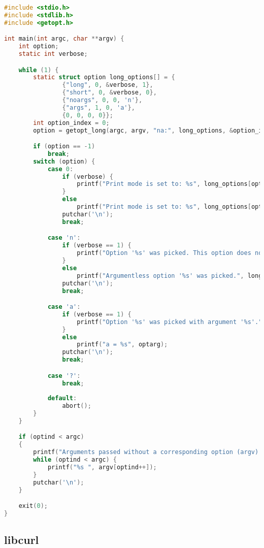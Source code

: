 \begin{lstlisting}[language=C, caption=Contoh sederhana penggunaan getopt\textunderscore long, label=code:getopt-usage-long]
#include <stdio.h>
#include <stdlib.h>
#include <getopt.h>

int main(int argc, char **argv) {
    int option;
    static int verbose;

    while (1) {
        static struct option long_options[] = {
                {"long", 0, &verbose, 1},
                {"short", 0, &verbose, 0},
                {"noargs", 0, 0, 'n'},
                {"args", 1, 0, 'a'},
                {0, 0, 0, 0}};
        int option_index = 0;
        option = getopt_long(argc, argv, "na:", long_options, &option_index);

        if (option == -1)
            break;
        switch (option) {
	        case 0:
    	        if (verbose) {
	                printf("Print mode is set to: %s", long_options[option_index].name);
	            }
	            else
	                printf("Print mode is set to: %s", long_options[option_index].name);
	            putchar('\n');
	            break;

    	    case 'n':
	            if (verbose == 1) {
	                printf("Option '%s' was picked. This option does not require any arguments.", long_options[option_index].name);
    	        }
	            else
	                printf("Argumentless option '%s' was picked.", long_options[option_index].name);
	            putchar('\n');
	            break;

    	    case 'a':
	            if (verbose == 1) {
	                printf("Option '%s' was picked with argument '%s'.", long_options[option_index].name, optarg);
	            }
	            else
	                printf("a = %s", optarg);
	            putchar('\n');
	            break;

    	    case '?':
	            break;
	
	        default:
	            abort();
        }
    }

    if (optind < argc)
    {
        printf("Arguments passed without a corresponding option (argv): ");
        while (optind < argc) {
            printf("%s ", argv[optind++]);
        }
        putchar('\n');
    }

    exit(0);
}
\end{lstlisting}

\subsection[libcurl]{libcurl \cite{stenberg:2022:everythingcurl}}
\label{sec:cmodules-libcurl}

